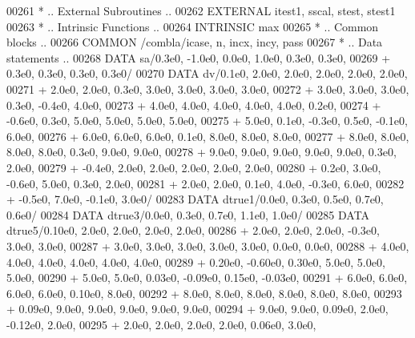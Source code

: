 \begin{DoxyCode}
00261 \textcolor{comment}{*     .. External Subroutines ..}
00262       \textcolor{keywordtype}{EXTERNAL}          itest1, sscal, stest, stest1
00263 \textcolor{comment}{*     .. Intrinsic Functions ..}
00264       \textcolor{keywordtype}{INTRINSIC}         max
00265 \textcolor{comment}{*     .. Common blocks ..}
00266       \textcolor{keyword}{COMMON}            /combla/icase, n, incx, incy, pass
00267 \textcolor{comment}{*     .. Data statements ..}
00268       \textcolor{keyword}{DATA}              sa/0.3e0, -1.0e0, 0.0e0, 1.0e0, 0.3e0, 0.3e0,
00269      +                  0.3e0, 0.3e0, 0.3e0, 0.3e0/
00270       \textcolor{keyword}{DATA}              dv/0.1e0, 2.0e0, 2.0e0, 2.0e0, 2.0e0, 2.0e0,
00271      +                  2.0e0, 2.0e0, 0.3e0, 3.0e0, 3.0e0, 3.0e0, 3.0e0,
00272      +                  3.0e0, 3.0e0, 3.0e0, 0.3e0, -0.4e0, 4.0e0,
00273      +                  4.0e0, 4.0e0, 4.0e0, 4.0e0, 4.0e0, 0.2e0,
00274      +                  -0.6e0, 0.3e0, 5.0e0, 5.0e0, 5.0e0, 5.0e0,
00275      +                  5.0e0, 0.1e0, -0.3e0, 0.5e0, -0.1e0, 6.0e0,
00276      +                  6.0e0, 6.0e0, 6.0e0, 0.1e0, 8.0e0, 8.0e0, 8.0e0,
00277      +                  8.0e0, 8.0e0, 8.0e0, 8.0e0, 0.3e0, 9.0e0, 9.0e0,
00278      +                  9.0e0, 9.0e0, 9.0e0, 9.0e0, 9.0e0, 0.3e0, 2.0e0,
00279      +                  -0.4e0, 2.0e0, 2.0e0, 2.0e0, 2.0e0, 2.0e0,
00280      +                  0.2e0, 3.0e0, -0.6e0, 5.0e0, 0.3e0, 2.0e0,
00281      +                  2.0e0, 2.0e0, 0.1e0, 4.0e0, -0.3e0, 6.0e0,
00282      +                  -0.5e0, 7.0e0, -0.1e0, 3.0e0/
00283       \textcolor{keyword}{DATA}              dtrue1/0.0e0, 0.3e0, 0.5e0, 0.7e0, 0.6e0/
00284       \textcolor{keyword}{DATA}              dtrue3/0.0e0, 0.3e0, 0.7e0, 1.1e0, 1.0e0/
00285       \textcolor{keyword}{DATA}              dtrue5/0.10e0, 2.0e0, 2.0e0, 2.0e0, 2.0e0,
00286      +                  2.0e0, 2.0e0, 2.0e0, -0.3e0, 3.0e0, 3.0e0,
00287      +                  3.0e0, 3.0e0, 3.0e0, 3.0e0, 3.0e0, 0.0e0, 0.0e0,
00288      +                  4.0e0, 4.0e0, 4.0e0, 4.0e0, 4.0e0, 4.0e0,
00289      +                  0.20e0, -0.60e0, 0.30e0, 5.0e0, 5.0e0, 5.0e0,
00290      +                  5.0e0, 5.0e0, 0.03e0, -0.09e0, 0.15e0, -0.03e0,
00291      +                  6.0e0, 6.0e0, 6.0e0, 6.0e0, 0.10e0, 8.0e0,
00292      +                  8.0e0, 8.0e0, 8.0e0, 8.0e0, 8.0e0, 8.0e0,
00293      +                  0.09e0, 9.0e0, 9.0e0, 9.0e0, 9.0e0, 9.0e0,
00294      +                  9.0e0, 9.0e0, 0.09e0, 2.0e0, -0.12e0, 2.0e0,
00295      +                  2.0e0, 2.0e0, 2.0e0, 2.0e0, 0.06e0, 3.0e0,

\end{DoxyCode}
